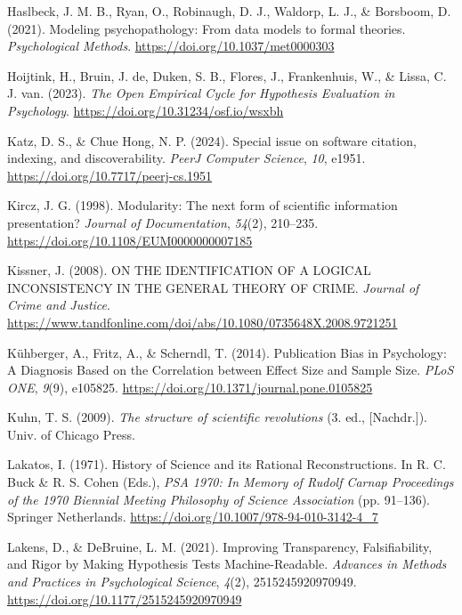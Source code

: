 \documentclass[man]{apa7}
\newlength{\cslhangindent}
\newenvironment{CSLReferences}[2] %
 {\begin{list}{}{%
  \setlength{\itemindent}{0pt}
  \setlength{\leftmargin}{0pt}
  \setlength{\parsep}{0pt}
  \ifodd #1
   \setlength{\leftmargin}{\cslhangindent}
   \setlength{\itemindent}{-1\cslhangindent}
  \fi
  \setlength{\itemsep}{#2\baselineskip}}}
 {\end{list}}
\begin{document}
\begin{CSLReferences}{1}{0}
Haslbeck, J. M. B., Ryan, O., Robinaugh, D. J., Waldorp, L. J., \& Borsboom, D. (2021). Modeling psychopathology: {From} data models to formal theories. \emph{Psychological Methods}. \url{https://doi.org/10.1037/met0000303}

Hoijtink, H., Bruin, J. de, Duken, S. B., Flores, J., Frankenhuis, W., \& Lissa, C. J. van. (2023). \emph{The {Open Empirical Cycle} for {Hypothesis Evaluation} in {Psychology}}. \url{https://doi.org/10.31234/osf.io/wsxbh}

Katz, D. S., \& Chue Hong, N. P. (2024). Special issue on software citation, indexing, and discoverability. \emph{PeerJ Computer Science}, \emph{10}, e1951. \url{https://doi.org/10.7717/peerj-cs.1951}

Kircz, J. G. (1998). Modularity: The next form of scientific information presentation? \emph{Journal of Documentation}, \emph{54}(2), 210--235. \url{https://doi.org/10.1108/EUM0000000007185}

Kissner, J. (2008). {ON THE IDENTIFICATION OF A LOGICAL INCONSISTENCY IN THE GENERAL THEORY OF CRIME}. \emph{Journal of Crime and Justice}. \url{https://www.tandfonline.com/doi/abs/10.1080/0735648X.2008.9721251}

Kühberger, A., Fritz, A., \& Scherndl, T. (2014). Publication {Bias} in {Psychology}: {A Diagnosis Based} on the {Correlation} between {Effect Size} and {Sample Size}. \emph{PLoS ONE}, \emph{9}(9), e105825. \url{https://doi.org/10.1371/journal.pone.0105825}

Kuhn, T. S. (2009). \emph{The structure of scientific revolutions} (3. ed., {[}Nachdr.{]}). Univ. of Chicago Press.

Lakatos, I. (1971). History of {Science} and its {Rational Reconstructions}. In R. C. Buck \& R. S. Cohen (Eds.), \emph{{PSA} 1970: {In Memory} of {Rudolf Carnap Proceedings} of the 1970 {Biennial Meeting Philosophy} of {Science Association}} (pp. 91--136). Springer Netherlands. \url{https://doi.org/10.1007/978-94-010-3142-4_7}

Lakens, D., \& DeBruine, L. M. (2021). Improving {Transparency}, {Falsifiability}, and {Rigor} by {Making Hypothesis Tests Machine-Readable}. \emph{Advances in Methods and Practices in Psychological Science}, \emph{4}(2), 2515245920970949. \url{https://doi.org/10.1177/2515245920970949}


\end{CSLReferences}
\end{document}
